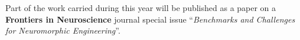 Part of the work carried during this year will be published as a paper on a 
\textbf{Frontiers in Neuroscience} journal special issue ``\emph{Benchmarks and Challenges for Neuromorphic Engineering}''.